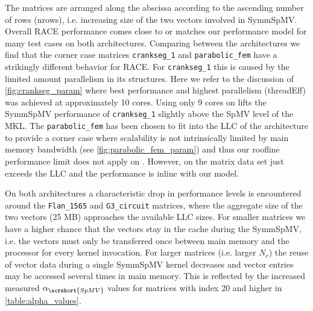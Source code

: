 The matrices are arranged along the abscissa according to the ascending number of rows (\acrshort{nrows}), i.e. increasing size of the two vectors involved in \acrshort{SymmSpMV}. Overall \acrshort{RACE}  performance comes close to or matches our performance model for many test cases on both architectures. 
Comparing between the architectures we find that the corner case matrices \texttt{crankseg\_1} and \texttt{parabolic\_fem} have a strikingly different behavior for \acrshort{RACE}. For \texttt{crankseg\_1} this is caused by the limited amount parallelism in its structures. Here we refer to the discussion of \cref{fig:crankseg_param} where best performance and highest parallelism (\acrshort{threadEff}) was achieved at approximately 10 cores. Using only 9 cores on \SKX lifts the \acrshort{SymmSpMV} performance of  \texttt{crankseg\_1} slightly above the \acrshort{SpMV} level of the MKL. The \texttt{parabolic\_fem} has been chosen to fit into the LLC of the \SKX architecture to provide a corner case where scalability is not intrinsically limited by main memory bandwidth (see  \cref{fig:parabolic_fem_param}) and thus our roofline performance limit does not apply on \SKX. However, on \IVB the matrix data set just exceeds the LLC and the performance is inline with our model. 

On both architectures a characteristic drop in performance levels is encountered around the \texttt{Flan\_1565} and \texttt{G3\_circuit} matrices, where the aggregate size of the two vectors (25 MB) approaches the available LLC sizes. For smaller matrices we have a higher chance that the vectors stay in the cache during the \acrshort{SymmSpMV}, i.e. the vectors must only be transferred once between main memory and the processor for every kernel invocation. 
For larger matrices (i.e. larger $N_r$) the reuse of vector data during a single \acrshort{SymmSpMV} kernel decreases and vector entries may be accessed several times in main memory. This is reflected by the increased measured $\alpha_{\acrshort{SpMV}}$ values for matrices with index 20 and higher in \cref{table:alpha_values}. 

